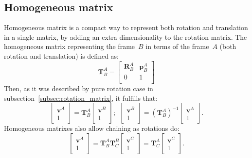 \subsection{Homogeneous matrix}
\label{subsec:homogeneous_matrix}
Homogeneous matrix is a compact way to represent both rotation and translation in a single matrix, by adding an extra dimensionality to the rotation matrix.  
The homogeneous matrix representing the frame~$B$ in terms of the frame~$A$ (both rotation and translation) is defined as:
\begin{equation}
 \mathbf{T}^A_B = 
 \left[
 \begin{array}{cc}
  \mathbf{R}^A_B & \mathbf{p}^A_B \\
  0	& 	1 \\
 \end{array}
\right]
\end{equation}
Then, as it was described by pure rotation case in subsection~\ref{subsec:rotation_matrix}, it fulfills that:
\begin{equation}
\left[
 \begin{array}{c}
  \mathbf{v}^A \\
  1
 \end{array}
 \right]
 = \mathbf{T}^A_B 
 \left[
 \begin{array}{c}
  \mathbf{v}^B \\
  1
 \end{array}
 \right]; \ \
 \left[
 \begin{array}{c}
  \mathbf{v}^B \\
  1
 \end{array}
 \right]
  = (\mathbf{T}^A_B)^{-1} 
 \left[
 \begin{array}{c}
  \mathbf{v}^A \\
  1
 \end{array}
 \right].
\end{equation}
Homogeneous matrixes also allow chaining as rotations do:
\begin{equation}
 \left[
 \begin{array}{c}
  \mathbf{v}^A \\
  1
 \end{array}
 \right]
 = \mathbf{T}^A_B \mathbf{T}^B_C 
  \left[
 \begin{array}{c}
  \mathbf{v}^C \\
  1
 \end{array}
 \right]
 = \mathbf{T}^A_C 
  \left[
 \begin{array}{c}
  \mathbf{v}^C \\
  1
 \end{array}
 \right].
\end{equation}

